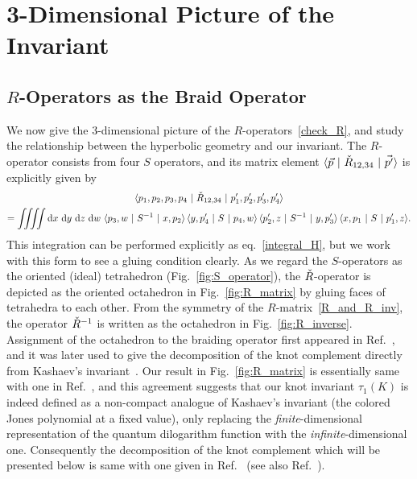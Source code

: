 \documentclass[12pt]{article}
\numberwithin{equation}{section}
\begin{document}
\section{3-Dimensional Picture of the  Invariant}

\subsection{$R$-Operators as the Braid Operator}

We now give the 3-dimensional picture of the
$R$-operators~\eqref{check_R}, and study  the relationship between the
hyperbolic geometry and our invariant.
The $R$-operator consists from four  $S$ operators, and its
matrix element
$\langle \vec{p} \ | \ \Check{R}_{12,34} \ | \  \vec{p^\prime} \rangle$
is explicitly  given by
\begin{multline}
  \label{R_element_int}
  \langle p_1, p_2, p_3, p_4 \  | \
  \Check{R}_{12,34}  \ | \
  p_1^\prime , p_2^\prime, p_3^\prime, p_4^\prime \rangle
  \\
  =
  \iiiint \mathrm{d} x \ \mathrm{d} y \ \mathrm{d} z \
  \mathrm{d} w \
  \langle p_3, w \ | \  S^{-1}  \ | \  x, p_2 \rangle \,
  \langle y, p_4^\prime \ | \  S \  | \  p_4 , w \rangle \,
  \langle p_2^\prime,  z \ | \  S^{-1} \  | \  y, p_3^\prime \rangle \,
  \langle x, p_1 \  | \  S \  | \  p_1^\prime , z \rangle   .
\end{multline}
This integration can be performed explicitly  as eq.~\eqref{integral_H}, but we
work with this form to see a gluing condition clearly.
As we regard the  $S$-operators as the oriented (ideal) tetrahedron
(Fig.~\ref{fig:S_operator}),
the $\Check{R}$-operator is depicted as the oriented octahedron  in
Fig.~\ref{fig:R_matrix} by gluing faces of tetrahedra  to each other.
{}From the symmetry of the $R$-matrix~\eqref{R_and_R_inv}, the
operator $\Check{R}^{-1}$ is  written as the
octahedron  in Fig.~\ref{fig:R_inverse}.
Assignment of the octahedron to the braiding operator
first appeared  in Ref.~\citen{DThurs99a}, and
it was   later
used to give the  decomposition of the knot complement
directly from  Kashaev's invariant~\cite{YYokot00b}.
Our result in  Fig.~\ref{fig:R_matrix} is essentially same with one in
Ref.~, and  this
agreement  suggests  that
our knot invariant $\tau_1(K)$  is indeed  defined as
a non-compact analogue of
Kashaev's invariant (the colored Jones polynomial at a  fixed value),
only replacing the
\emph{finite}-dimensional representation of the quantum dilogarithm
function with the \emph{infinite}-dimensional one.
Consequently  the decomposition of the knot complement which will be presented
below
is same with one
given in Ref.~\citen{YYokot00b}
(see also Ref.~\citen{HMuraka00c}).
\end{document}
